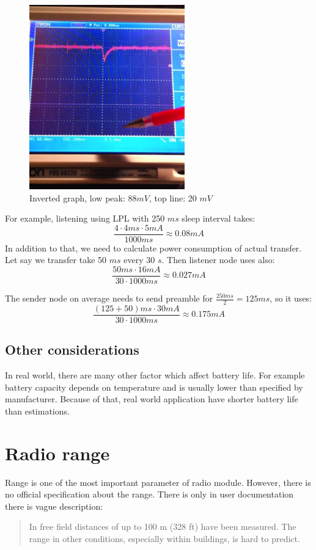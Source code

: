 \begin{figure}[h]
  \centering
  \includegraphics[width=0.6\textwidth]{img/low_power_receive_check.jpg}
  \caption{Inverted graph, low peak: $ 88 mV$, top line: 20 $ mV $}
  \label{fig:low_power_receive_check}
\end{figure}

For example, listening using LPL with 250 $ ms $ sleep interval takes:
$$
\frac{4 \cdot 4 ms \cdot 5 mA}{1000 ms} \approx 0.08 mA
$$
In addition to that, we need to calculate power consumption of actual transfer.
Let say we transfer take 50 $ ms $ every 30 $ s $.
Then listener node uses also:
$$
\frac{50 ms \cdot 16 mA}{30 \cdot 1000 ms} \approx 0.027 mA
$$

The sender node on average needs to send preamble for $ \frac{250 ms}{2} = 125 ms$, so it uses:
$$
\frac{(125 + 50) ms \cdot 30 mA}{30 \cdot 1000 ms} \approx 0.175 mA
$$

\subsection{Other considerations}
In real world, there are many other factor which affect battery life.
For example battery capacity depends on temperature and is usually lower than specified by manufacturer.
Because of that, real world application have shorter battery life than estimations.


\section{Radio range}

Range is one of the most important parameter of radio module.
However, there is no official specification about the range.
There is only in user documentation there is vague description:
\begin{quote}
In free field distances of up to 100 m (328 ft) have been measured. The range in other conditions,
especially within buildings, is hard to predict.
\end{quote}

